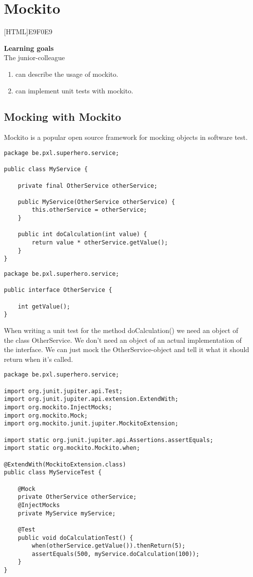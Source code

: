 \chapter{Mockito}

[HTML]{E9F0E9}{\parbox{\textwidth}{%
\noindent \textbf{Learning goals}\\
The junior-colleague
\begin{enumerate}[nolistsep]
\item can describe the usage of mockito.
\item can implement unit tests with mockito.
\end{enumerate}}}

\section{Mocking with Mockito}

Mockito is a popular open source framework for mocking objects in software test.

\begin{lstlisting}
package be.pxl.superhero.service;

public class MyService {

    private final OtherService otherService;

    public MyService(OtherService otherService) {
        this.otherService = otherService;
    }

    public int doCalculation(int value) {
        return value * otherService.getValue();
    }
}
\end{lstlisting}

\begin{lstlisting}
package be.pxl.superhero.service;

public interface OtherService {

    int getValue();
}
\end{lstlisting}

When writing a unit test for the method doCalculation() we need an object of the class OtherService. We don't need an object of an actual implementation of the interface. We can just mock the OtherService-object and tell it what it should return when it's called.

\begin{lstlisting}
package be.pxl.superhero.service;

import org.junit.jupiter.api.Test;
import org.junit.jupiter.api.extension.ExtendWith;
import org.mockito.InjectMocks;
import org.mockito.Mock;
import org.mockito.junit.jupiter.MockitoExtension;

import static org.junit.jupiter.api.Assertions.assertEquals;
import static org.mockito.Mockito.when;

@ExtendWith(MockitoExtension.class)
public class MyServiceTest {

    @Mock
    private OtherService otherService;
    @InjectMocks
    private MyService myService;

    @Test
    public void doCalculationTest() {
        when(otherService.getValue()).thenReturn(5);
        assertEquals(500, myService.doCalculation(100));
    }
}
\end{lstlisting}

